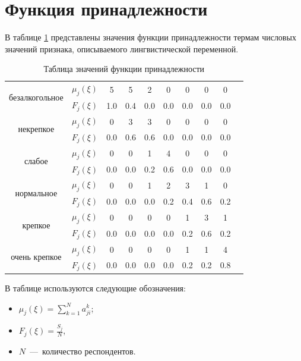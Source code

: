\section{Функция принадлежности}
В таблице \ref{tbl:4} представлены значения функции принадлежности термам числовых значений признака, описываемого лингвистической переменной.

\begin{table}[H]
	\begin{center}
	\caption{Таблица значений функции принадлежности}
	\label{tbl:4}
	\begin{tabular}{|c|c|c|c|c|c|c|c|c|c|}
		\cline{1-9}
		\multirow{2}{*}{безалкогольное}          &  $\mu_j(\xi)$ & 5   & 5   & 2   & 0   & 0   & 0   &  0\\ \cline{2-9}
		& $F_j(\xi)$ & 1.0 & 0.4 & 0.0 & 0.0 & 0.0 & 0.0 &  0.0\\ \cline{1-9}
		\multirow{2}{*}{некрепкое}    &  $\mu_j(\xi)$ & 0   & 3   & 3   & 0   & 0   & 0   &  0\\ \cline{2-9}
		& $F_j(\xi)$ & 0.0 & 0.6 & 0.6 & 0.0 & 0.0 & 0.0 & 0.0 \\ \cline{1-9}
		\multirow{2}{*}{слабое}    &  $\mu_j(\xi)$ & 0   & 0   & 1   & 4   & 0   & 0   &  0\\ \cline{2-9}
		& $F_j(\xi)$ & 0.0 & 0.0 & 0.2 & 0.6 & 0.0 & 0.0 & 0.0 \\ \cline{1-9}
		\multirow{2}{*}{нормальное}             &  $\mu_j(\xi)$ & 0   & 0   & 1   & 2   & 3   & 1   & 0 \\ \cline{2-9}
		& $F_j(\xi)$ & 0.0 & 0.0 & 0.0 & 0.2 & 0.4 & 0.6 & 0.2 \\ \cline{1-9}
		\multirow{2}{*}{крепкое}       &  $\mu_j(\xi)$ & 0   & 0   & 0   & 0   & 1  & 3   & 1 \\ \cline{2-9}
		& $F_j(\xi)$ & 0.0 & 0.0 & 0.0 & 0.0 & 0.2 & 0.6 & 0.2 \\ \cline{1-9}
		\multirow{2}{*}{очень крепкое} &  $\mu_j(\xi)$ & 0   & 0   & 0   & 0   & 1   & 1   &  4 \\ \cline{2-9}
		& $F_j(\xi)$ & 0.0 & 0.0 & 0.0 & 0.0 & 0.2 & 0.2 & 0.8 \\ \cline{1-9}
	\end{tabular}
	\end{center}
\end{table}

В таблице используются следующие обозначения:

\begin{itemize}
	\item $\mu_j(\xi) = \sum\limits_{k=1}^N a^{k}_{ji}$;
	\item $F_j(\xi) = \frac{S_j}{N}$,
	\item $N$~---~количество респондентов.
\end{itemize}

